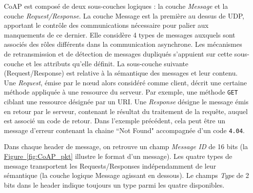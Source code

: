 \documentclass[]{report}
\newcommand{\wordlink}[2]{\hyperref[#2]{#1~\ref{#2}}}
\begin{document}
\par CoAP est composé de deux sous-couches logiques : la couche \textit{Message} et la couche \textit{Request/Response}. La couche Message est la première au dessus de UDP, apportant le contrôle des communications nécessaire pour palier aux manquements de ce dernier. Elle considère 4 types de messages auxquels sont associés des rôles différents dans la communication asynchrone. Les mécanismes de retransmission et de détection de messages dupliqués s'appuient sur cette sous-couche et les attributs qu'elle définit. La sous-couche suivante (Request/Response) est relative à la sémantique des messages et leur contenu. Une \textit{Request}, émise par le nœud alors considéré comme client, décrit une certaine méthode appliquée à une ressource du serveur. Par exemple, une méthode \texttt{GET} ciblant une ressource désignée par un URI. Une \textit{Response} désigne le message émis en retour par le serveur, contenant le résultat du traitement de la requête, auquel est associé un code de retour. Dans l'exemple précédent, cela peut être un message d'erreur contenant la chaine ``Not Found" accompagnée d'un code \texttt{4.04}.\\

\par Dans chaque header de message, on retrouve un champ \textit{Message ID} de 16 bits (la \wordlink{Figure}{fig:CoAP_pkt} illustre le format d'un message). Les quatre types de message transportent les Requests/Responses indépendamment de leur sémantique (la couche logique Message agissant en dessous). Le champs \textit{Type} de 2 bits dans le header indique toujours un type parmi les quatre disponibles.

\newpage
\end{document}
